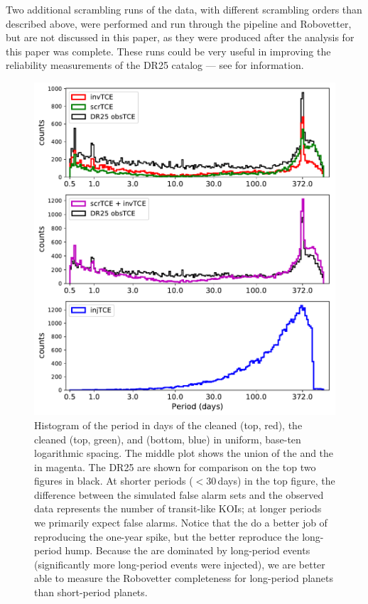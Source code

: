 Two additional scrambling runs of the data, with different scrambling orders than described above, were performed and run through the \Kepler{} pipeline and Robovetter, but are not discussed in this paper, as they were produced after the analysis for this paper was complete. These runs could be very useful in improving the reliability measurements of the DR25 catalog --- see \citealt{Coughlin2017a} for information.


\begin{figure}[hp]
 \begin{center}
  \includegraphics[width=0.975\linewidth]{f2.pdf}
  \caption{Histogram of the period in days of the cleaned  (top, red), the cleaned  (top, green), and  (bottom, blue) in uniform, base-ten logarithmic spacing. The middle plot shows the union of the \invtces{} and the \scrtces{} in magenta.  The DR25  are shown for comparison on the top two figures in black.  At shorter periods ($< 30$\,days) in the top figure, the difference between the simulated false alarm sets and the observed data represents the number of transit-like KOIs; at longer periods we primarily expect false alarms. Notice that the  do a better job of reproducing the one-year spike, but the  better reproduce the long-period hump. Because the  are dominated by long-period events (significantly more long-period events were injected), we are better able to measure the Robovetter completeness for long-period planets than short-period planets.}
  \label{f:simtces} 
 \end{center}
 \end{figure}



